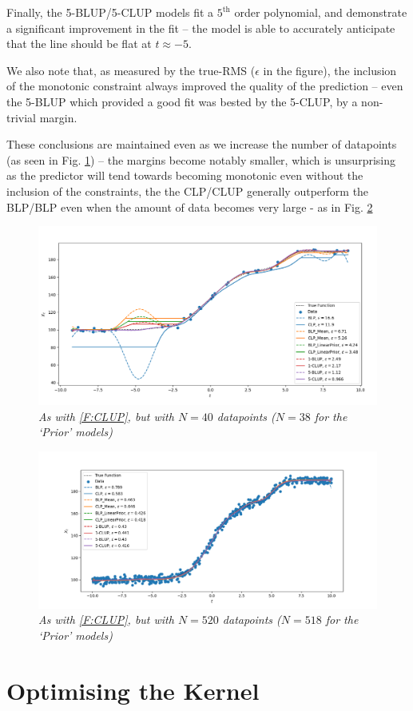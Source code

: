 \documentclass[]{article}
\begin{document}
		Finally, the 5-BLUP/5-CLUP models fit a $5^\text{th}$ order polynomial, and demonstrate a significant improvement in the fit -- the model is able to accurately anticipate that the line should be flat at $t\approx-5$.

		We also note that, as measured by the true-RMS ($\epsilon$ in the figure), the inclusion of the monotonic constraint always improved the quality of the prediction -- even the 5-BLUP which provided a good fit was bested by the 5-CLUP, by a non-trivial margin. 

		These conclusions are maintained even as we increase the number of datapoints (as seen in Fig. \ref{F:CLUP2}) -- the margins become notably smaller, which is unsurprising as the predictor will tend towards becoming monotonic even without the inclusion of the constraints, the the CLP/CLUP generally outperform the BLP/BLP even when the amount of data becomes very large - as in Fig. \ref{F:CLUP3}
		\begin{figure}[t]
			\includegraphics[width=\linewidth,keepaspectratio=true]{Figs/CLUP_comparison_moreData.png}
			\caption{\it As with \ref{F:CLUP}, but with $N=40$ datapoints ($N=38$ for the `Prior' models)}\label{F:CLUP2}
		\end{figure}
		\begin{figure}[t]
			\includegraphics[width=\linewidth,keepaspectratio=true]{Figs/CLUP_comparison_moremoreData.png}
			\caption{\it As with \ref{F:CLUP}, but with $N=520$ datapoints ($N=518$ for the `Prior' models)}\label{F:CLUP3}
		\end{figure}
	\section{Optimising the Kernel}
\end{document}
